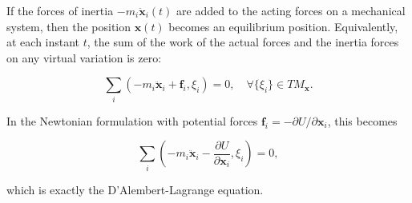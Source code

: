 If the forces of inertia $-m_i \ddot{\mathbf{x}}_i(t)$ are added to the acting forces on a mechanical system, then the position $\mathbf{x}(t)$ becomes an equilibrium position. Equivalently, at each instant $t$, the sum of the work of the actual forces and the inertia forces on any virtual variation is zero:

$$\sum_i \left( -m_i \ddot{\mathbf{x}}_i + \mathbf{f}_i, \xi_i \right) = 0, \quad \forall \{\xi_i\} \in TM_{\mathbf{x}}.$$

In the Newtonian formulation with potential forces $\mathbf{f}_i = -\partial U / \partial \mathbf{x}_i$, this becomes

$$\sum_i \left( -m_i \ddot{\mathbf{x}}_i - \frac{\partial U}{\partial \mathbf{x}_i}, \xi_i \right) = 0,$$

which is exactly the D'Alembert-Lagrange equation.
